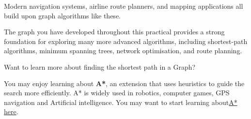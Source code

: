 \documentclass{csc2059practical}
\begin{document}
\begin{challengebox}
    Modern navigation systems, airline route planners, and mapping applications all build upon graph algorithms like these.
    
    The graph you have developed throughout this practical provides a strong foundation for exploring many more advanced algorithms, including shortest-path algorithms, minimum spanning trees, network optimisation, and route planning.
\end{challengebox}
\begin{tipbox}
Want to learn more about finding the shortest path in a Graph?  

You may enjoy learning about \textbf{A*}, an extension that uses heuristics to guide the search more efficiently.  A* is widely used in robotics, computer games, GPS navigation and Artificial intelligence.  You may want to start learning about\href{https://www.youtube.com/watch?v=ySN5Wnu88nE}{A* here}. 
\end{tipbox}
\end{document}
